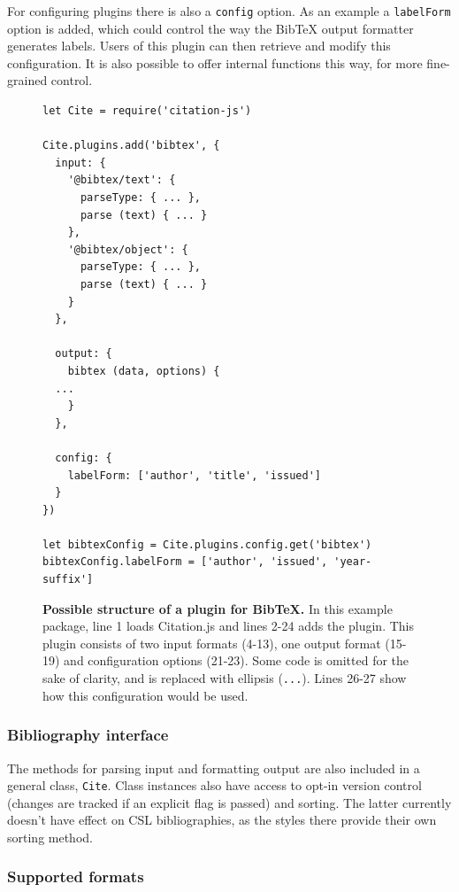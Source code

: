 \documentclass[fleqn,10pt,lineno]{wlpeerj} %
\begin{document}
For configuring plugins there is also a \texttt{config} option. As an example a \texttt{labelForm} option is added, which could control the way the BibTeX output formatter generates labels. Users of this plugin can then retrieve and modify this configuration. It is also possible to offer internal functions this way, for more fine-grained control.

\begin{figure}[ht]
\centering
\begin{verbatim}
let Cite = require('citation-js')

Cite.plugins.add('bibtex', {
  input: {
    '@bibtex/text': {
      parseType: { ... },
      parse (text) { ... }
    },
    '@bibtex/object': {
      parseType: { ... },
      parse (text) { ... }
    }
  },

  output: {
    bibtex (data, options) {
  ...
    }
  },

  config: {
    labelForm: ['author', 'title', 'issued']
  }
})

let bibtexConfig = Cite.plugins.config.get('bibtex')
bibtexConfig.labelForm = ['author', 'issued', 'year-suffix']
\end{verbatim}
\caption{\textbf{Possible structure of a plugin for BibTeX.}
In this example package, line 1 loads Citation.js and lines 2-24 adds the plugin. This plugin consists of two input formats (4-13), one output format (15-19) and configuration options (21-23). Some code is omitted for the sake of clarity, and is replaced with ellipsis (\texttt{...}). Lines 26-27 show how this configuration would be used.
}
\label{code:plugin}
\end{figure}

\subsubsection*{Bibliography interface}

The methods for parsing input and formatting output are also included in a general class, \texttt{Cite}. Class instances also have access to opt-in version control (changes are tracked if an explicit flag is passed) and sorting. The latter currently doesn't have effect on CSL bibliographies, as the styles there provide their own sorting method.

\subsubsection*{Supported formats}
\end{document}
